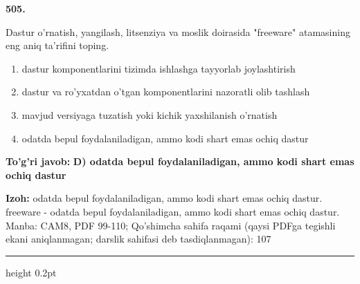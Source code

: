 \documentclass[10pt,a4paper]{article}
\begin{document}
{\bfseries\sffamily\color{ink} 505.}
\par
Dastur o'rnatish, yangilash, litsenziya va moslik doirasida "freeware" atamasining eng aniq ta'rifini toping.
\begin{enumerate}[label=\Alph*),leftmargin=9mm]
\item dastur komponentlarini tizimda ishlashga tayyorlab joylashtirish
\item dastur va ro'yxatdan o'tgan komponentlarini nazoratli olib tashlash
\item mavjud versiyaga tuzatish yoki kichik yaxshilanish o'rnatish
\item odatda bepul foydalaniladigan, ammo kodi shart emas ochiq dastur
\end{enumerate}
\begin{tcolorbox}[enhanced,breakable,colback=teal!4,colframe=teal!60!black,boxrule=0.45pt,arc=1.2mm,left=2.7mm,right=2.7mm,top=1.8mm,bottom=1.8mm,before skip=2mm,after skip=2mm]
{\bfseries\sffamily\color{teal}To'g'ri javob:} \textbf{D) odatda bepul foydalaniladigan, ammo kodi shart emas ochiq dastur}
\par\smallskip
{\bfseries Izoh:} odatda bepul foydalaniladigan, ammo kodi shart emas ochiq dastur. freeware - odatda bepul foydalaniladigan, ammo kodi shart emas ochiq dastur. Manba: CAM8, PDF 99-110; Qo'shimcha sahifa raqami (qaysi PDFga tegishli ekani aniqlanmagan; darslik sahifasi deb tasdiqlanmagan): 107
\end{tcolorbox}
\vspace{2mm}\hrule height 0.2pt\vspace{3mm}
\end{document}
